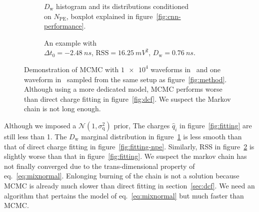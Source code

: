 \begin{figure}[H]
  \begin{subfigure}{.5\textwidth}
    \centering
    \resizebox{\textwidth}{!}{}
    \caption{\label{fig:mcmc-npe} $D_\mathrm{w}$ histogram and its distributions conditioned \\ on $N_{\mathrm{PE}}$, boxplot explained in figure~\ref{fig:cnn-performance}.}
  \end{subfigure}
  \begin{subfigure}{.5\textwidth}
    \centering
    \resizebox{\textwidth}{!}{}
    \caption{\label{fig:mcmc}An example with \\ $\Delta{t_0}=\SI{-2.48}{ns}$, $\mathrm{RSS}=\SI{16.25}{mV^2}$, $D_\mathrm{w}=\SI{0.76}{ns}$.}
  \end{subfigure}
  \caption{\label{fig:mcmc-performance}Demonstration of MCMC with $\num[retain-unity-mantissa=false]{1e4}$ waveforms in~ and one waveform in~ sampled from the same setup as figure~\ref{fig:method}.  Although using a more dedicated model, MCMC performs worse than direct charge fitting in figure~\ref{fig:dcf}. We suspect the Markov chain is not long enough.}
\end{figure}
Although we imposed a $\mathcal{N}(1, \sigma_\mathrm{q}^2)$ prior, The charges $\hat{q}_i$ in figure~\ref{fig:fitting} are still less than 1.  The $D_\mathrm{w}$ marginal distribution in figure~\ref{fig:mcmc-npe} is less smooth than that of direct charge fitting in figure~\ref{fig:fitting-npe}.  Similarly, RSS in figure~\ref{fig:mcmc} is slightly worse than that in figure~\ref{fig:fitting}.  We suspect the markov chain has not finally converged due to the trans-dimensional property of eq.~\eqref{eq:mixnormal}.  Enlonging burning of the chain is not a solution because MCMC is already much slower than direct fitting in section~\ref{sec:dcf}.  We need an algorithm that pertains the model of eq.~\eqref{eq:mixnormal} but much faster than MCMC.

